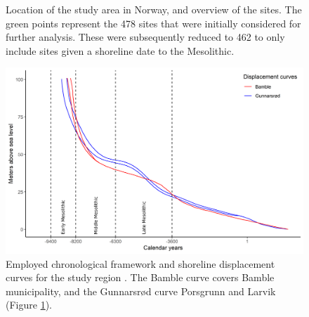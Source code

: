 \documentclass[12pt, a4paper]{article}
\begin{document}
\begin{figure}[h]
	\centering
	\caption{Location of the study area in Norway, and overview of the sites. The green
		points represent the 478 sites that were initially considered for further analysis. These
		were subsequently reduced to 462 to only include sites given a shoreline date to the Mesolithic.}
	\label{fig:overview}
\end{figure}
\begin{figure}[h]
	\centering
	\includegraphics[width = \linewidth]{displacement.png}
	\caption{Employed chronological framework and shoreline displacement curves for the study region \citep[after][]{sorensen2014, sorensen2015}. The Bamble curve covers Bamble municipality, and the Gunnarsr{\o}d curve Porsgrunn and Larvik (Figure \ref{fig:overview}).}
	\label{fig:displacement}
\end{figure}
\end{document}
